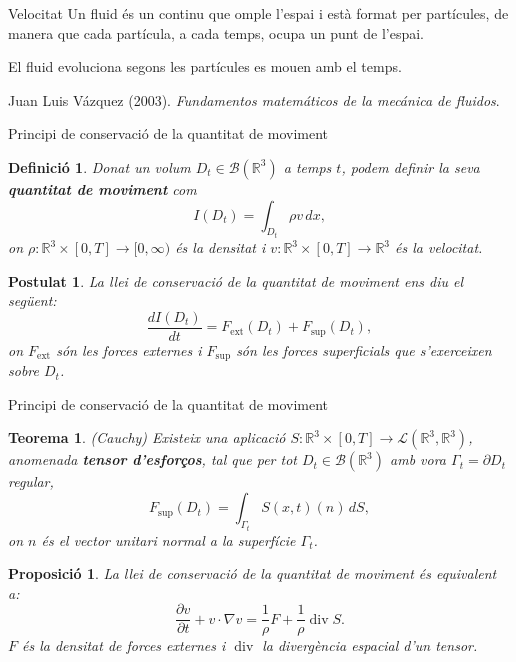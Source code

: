 \documentclass{beamer}
\DeclareMathOperator{\diver}{div}
\newtheorem{teorema}{Teorema}
\newtheorem{definicio}{Definici\'{o}}
\newtheorem{proposicio}{Proposici\'{o}}
\newtheorem{postulat}{Postulat}
\begin{document}
\begin{frame}{Velocitat}
Un fluid \'{e}s un continu que omple l'espai i est\`{a} format per part\'{i}cules, de manera que cada part\'{i}cula, a cada temps, ocupa un punt de l'espai.
\vspace{3mm}

El fluid evoluciona segons les part\'{i}cules es mouen amb el temps.
\vspace{10mm}

Juan Luis V\'{a}zquez (2003). \emph{Fundamentos matem\'{a}ticos de la mec\'{a}nica de fluidos}.
\end{frame}

\begin{frame}{Principi de conservaci\'{o} de la quantitat de moviment}
\begin{definicio}
Donat un volum $D_t\in\mathcal{B}(\mathbb{R}^3)$ a temps $t$, podem definir la seva \textbf{quantitat de moviment} com
\[I(D_t)=\int_{D_t}\rho v\,dx,\]
on $\rho:\mathbb{R}^3\times[0,T]\rightarrow[0,\infty)$ \'{e}s la densitat i $v:\mathbb{R}^3\times[0,T]\rightarrow\mathbb{R}^3$ \'{e}s la velocitat.
\end{definicio}
\pause
\begin{postulat}
La llei de conservaci\'{o} de la quantitat de moviment ens diu el seg\"{u}ent:
\[\frac{dI(D_t)}{dt}=F_{\text{ext}}(D_t)+F_{\text{sup}}(D_t),\]
on $F_{\text{ext}}$ s\'{o}n les forces externes i $F_{\text{sup}}$ s\'{o}n les forces superficials que s'exerceixen sobre $D_t$.
\end{postulat}
\end{frame}

\begin{frame}{Principi de conservaci\'{o} de la quantitat de moviment}
\begin{teorema}
(Cauchy) Existeix una aplicaci\'{o} $S:\mathbb{R}^3\times[0,T]\rightarrow\mathcal{L}(\mathbb{R}^3,\mathbb{R}^3)$, anomenada \textbf{tensor d'esfor\c{c}os}, tal que per tot $D_t\in\mathcal{B}(\mathbb{R}^3)$ amb vora $\Gamma_t=\partial D_t$ regular,
\[F_{\text{sup}}(D_t)=\int_{\Gamma_t}S(x,t)(n)\,dS,\]
on $n$ \'{e}s el vector unitari normal a la superf\'{i}cie $\Gamma_t$.
\end{teorema}
\pause
\begin{proposicio}
La llei de conservaci\'{o} de la quantitat de moviment \'{e}s equivalent a:
\[\frac{\partial v}{\partial t}+v\cdot\nabla v=\frac{1}{\rho}F+\frac{1}{\rho}\diver S.\]
$F$ \'{e}s la densitat de forces externes i $\diver$ la diverg\`{e}ncia espacial d'un tensor.
\end{proposicio}
\end{frame}
\end{document}
